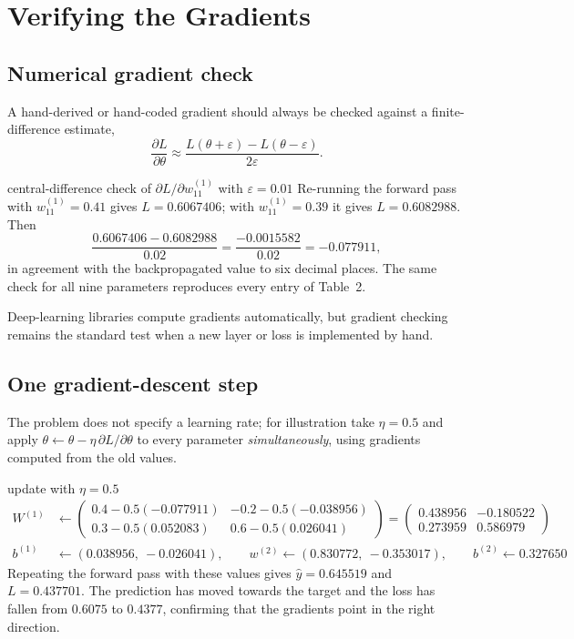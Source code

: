 \documentclass[11pt]{article}
\begin{document}
\section{Verifying the Gradients}
\subsection{Numerical gradient check}
A hand-derived or hand-coded gradient should always be checked against a finite-difference estimate,
\[
\frac{\partial L}{\partial\theta}\approx\frac{L(\theta+\varepsilon)-L(\theta-\varepsilon)}{2\varepsilon}.
\]
\begin{example}{central-difference check of $\partial L/\partial w^{(1)}_{11}$ with $\varepsilon=0.01$}
Re-running the forward pass with $w^{(1)}_{11}=0.41$ gives $L=0.6067406$; with $w^{(1)}_{11}=0.39$ it gives $L=0.6082988$. Then
\[
\frac{0.6067406-0.6082988}{0.02}=\frac{-0.0015582}{0.02}=-0.077911,
\]
in agreement with the backpropagated value to six decimal places. The same check for all nine parameters reproduces every entry of Table~2.
\end{example}
Deep-learning libraries compute gradients automatically, but gradient checking remains the standard test when a new layer or loss is implemented by hand.

\subsection{One gradient-descent step}
The problem does not specify a learning rate; for illustration take $\eta=0.5$ and apply $\theta\leftarrow\theta-\eta\,\partial L/\partial\theta$ to every parameter \emph{simultaneously}, using gradients computed from the old values.
\begin{example}{update with $\eta=0.5$}
\begin{align*}
W^{(1)}&\leftarrow\begin{pmatrix}0.4-0.5(-0.077911)&-0.2-0.5(-0.038956)\\0.3-0.5(0.052083)&0.6-0.5(0.026041)\end{pmatrix}=\begin{pmatrix}0.438956&-0.180522\\0.273959&0.586979\end{pmatrix}\\[3pt]
b^{(1)}&\leftarrow(0.038956,\ -0.026041),\qquad w^{(2)}\leftarrow(0.830772,\ -0.353017),\qquad b^{(2)}\leftarrow0.327650
\end{align*}
Repeating the forward pass with these values gives $\hat y=0.645519$ and $L=0.437701$. The prediction has moved towards the target and the loss has fallen from $0.6075$ to $0.4377$, confirming that the gradients point in the right direction.
\end{example}
\end{document}
